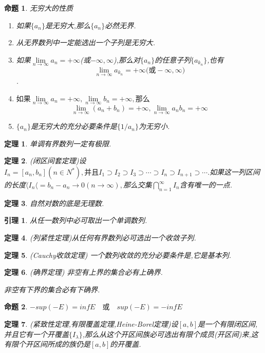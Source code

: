\documentclass[UTF8]{ctexart}
\newtheorem{theorem}{定理}[section]
\newtheorem{pro}{命题}[section]
\newtheorem{lemma}{引理}[section]
\begin{document}
	\begin{pro}无穷大的性质
		\begin{enumerate}
			\item 如果$\{a_n\}$是无穷大,那么$\{a_n\}$必然无界.
			\item 从无界数列中一定能选出一个子列是无穷大.
			\item 如果$\lim\limits_{n\to\infty}a_n=+\infty$(或$-\infty,\infty$),那么对$\{a_n\}$的任意子列$\{a_{k_n}\}$,也有\[\lim\limits_{n\to\infty}a_{k_n}=+\infty\mbox{(或}-\infty,\infty)\].
			\item $\mbox{如果}\lim\limits_{n\to\infty}a_n=+\infty,\lim\limits_{n\to\infty}b_n=+\infty,\mbox{那么}$\[\lim\limits_{n\to\infty}(a_n+b_n)=+\infty,\lim\limits_{n\to\infty}a_nb_n=+\infty\]
			\item $\{a_n\}$是无穷大的充分必要条件是$\{1/a_n\}$为无穷小.
		\end{enumerate}
	\end{pro}
	\begin{theorem}
		单调有界数列一定有极限.
	\end{theorem}
	\begin{theorem}
		(闭区间套定理)设$I_n=[a_n,b_n](n\in N^*),\mbox{并且}I_1\supset I_2 \supset I_3 \supset \cdots \supset I_n\supset I_{n+1}\supset \cdots.$如果这一列区间的长度$\langle I_n\langle=b_n-a_n\to 0(n\to \infty),$那么交集$\bigcap\limits_{n=1}^\infty I_n$含有唯一的一点.
	\end{theorem}
	\begin{theorem}
		自然对数的底是无理数.
	\end{theorem}
	\begin{lemma}
		从任一数列中必可取出一个单调数列.
	\end{lemma}
	\begin{theorem}
		(列紧性定理)从任何有界数列必可选出一个收敛子列.
	\end{theorem}
	\begin{theorem}(Cauchy收敛定理)
		一个数列收敛的充分必要条件是,它是基本列.
	\end{theorem}
	\begin{theorem}(确界定理)
		非空有上界的集合必有上确界.
		
		非空有下界的集合必有下确界.
	\end{theorem}
	\begin{pro}
		$-sup(-E)=inf E\quad \mbox{或}\quad sup(-E)=-infE$ 
	\end{pro}
	\begin{theorem}
		(紧致性定理,有限覆盖定理,Heine-Borel定理)设$[a,b]$是一个有限闭区间,并且它有一个开覆盖$\{I_\lambda\}$,那么从这个开区间族必可选出有限个成员(开区间)来,这有限个开区间所成的族仍是$[a,b]$的开覆盖.
	\end{theorem}	
\end{document}
